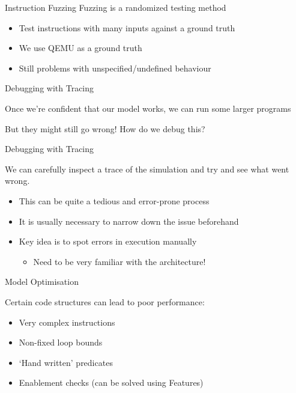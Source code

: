 \begin{frame}{Instruction Fuzzing}
Fuzzing is a randomized testing method

\begin{itemize}
\item<2-> Test instructions with many inputs against a ground truth
\item<3-> We use QEMU as a ground truth
\item<4-> \alert{Still problems with unspecified/undefined behaviour}
\end{itemize}



\end{frame}

\begin{frame}{Debugging with Tracing}

Once we're confident that our model works, we can run some larger programs

\pause

\alert{But they might still go wrong! How do we debug this?}

\end{frame}


\begin{frame}{Debugging with Tracing}

We can carefully inspect a trace of the simulation and try and see
what went wrong.
\begin{itemize}
\item This can be quite a tedious and error-prone process
\item It is usually necessary to narrow down the issue beforehand
\item Key idea is to spot errors in execution manually
\begin{itemize}
\item Need to be very familiar with the architecture!
\end{itemize}
\end{itemize}

\end{frame}

\begin{frame}{Model Optimisation}

Certain code structures can lead to poor performance:
\begin{itemize}
\item Very complex instructions
\item Non-fixed loop bounds
\item `Hand written' predicates
\item Enablement checks (can be solved using Features)
\end{itemize} 

\end{frame}

